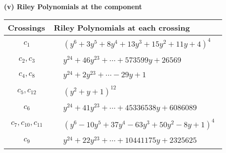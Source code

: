 \documentclass[1p]{elsarticle_modified}
\theoremstyle{definition}
\begin{document}
\flushleft \textbf{(v) Riley Polynomials at the component}\newline \\
\begin{tabular}{m{50pt}|m{274pt}}
Crossings & \hspace{64pt}Riley Polynomials at each crossing \\
\hline $$\begin{aligned}c_{1}\end{aligned}$$&$\begin{aligned}
&(y^6+3 y^5+8 y^4+13 y^3+15 y^2+11 y+4)^4
\end{aligned}$\\
\hline $$\begin{aligned}c_{2},c_{3}\end{aligned}$$&$\begin{aligned}
&y^{24}+46 y^{23}+\cdots+573599 y+26569
\end{aligned}$\\
\hline $$\begin{aligned}c_{4},c_{8}\end{aligned}$$&$\begin{aligned}
&y^{24}+2 y^{23}+\cdots-29 y+1
\end{aligned}$\\
\hline $$\begin{aligned}c_{5},c_{12}\end{aligned}$$&$\begin{aligned}
&(y^2+y+1)^{12}
\end{aligned}$\\
\hline $$\begin{aligned}c_{6}\end{aligned}$$&$\begin{aligned}
&y^{24}+41 y^{23}+\cdots+45336538 y+6086089
\end{aligned}$\\
\hline $$\begin{aligned}c_{7},c_{10},c_{11}\end{aligned}$$&$\begin{aligned}
&(y^6-10 y^5+37 y^4-63 y^3+50 y^2-8 y+1)^4
\end{aligned}$\\
\hline $$\begin{aligned}c_{9}\end{aligned}$$&$\begin{aligned}
&y^{24}+22 y^{23}+\cdots+10441175 y+2325625
\end{aligned}$\\
\hline
\end{tabular}\\~\\
\end{document}
